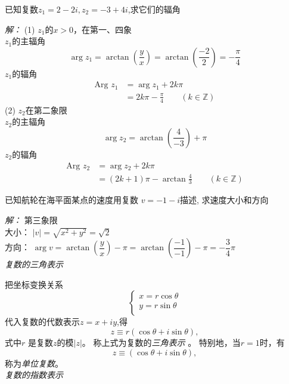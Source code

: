 \begin{example}
    已知复数$z_1=2-2i, z_2=-3+4i$,求它们的辐角
\end{example}
\emph{解： } (1) $z_1$的$x>0$，在第一、四象 \\
$z_1$的主辐角
\[ \arg z_1 = \arctan (\frac{y}{x} )  = \arctan (\frac{-2}{2} ) = - \frac{\pi}{4}\]
$z_1$的辐角
\[ \begin{aligned}
    \text{Arg } z_1   &= \arg z_1 + 2 k \pi \\ 
    &=  2 k \pi  - \frac{\pi}{4}  \qquad (k \in \mathbb{Z})
\end{aligned} \]
(2) $z_2$在第二象限 \\
$z_2$的主辐角
\[ \arg z_2 = \arctan (\frac{4}{-3}) + \pi \]
$z_2$的辐角
\[ \begin{aligned}
    \text{Arg } z_2  &=  \arg z_2 + 2 k \pi \\ 
    &=  (2 k +1 ) \pi  - \arctan \frac{4}{3} \qquad (k \in \mathbb{Z})
\end{aligned} \]
\begin{example}
    已知航轮在海平面某点的速度用复数 $v = - 1 - i$描述, 求速度大小和方向
\end{example}
\emph{解： }  第三象限   \\
大小： $\left\vert v \right\vert = \sqrt{x^2 + y^2} = \sqrt{2}  $ \\
方向： $\arg v = \arctan (\dfrac{y}{x}) - \pi = \arctan (\dfrac{-1}{-1}) - \pi  = - \dfrac{3}{4} \pi$ \\

\noindent \emph{复数的三角表示} 

把坐标变换关系
\[ \begin{cases}
	x = r\cos\theta \\
	y = r \sin \theta \\ 
\end{cases}\]
代入复数的代数表示$z= x+ iy$,得
\begin{equation}\label{eq:sjbs}
    z \equiv  r (\cos \theta + i \sin\theta ), 
\end{equation}
式中$r$ 是复数$z$的模$\left\vert z\right\vert $。 称上式为复数的\emph{三角表示 }。
特别地，当$r=1$时，有 
\begin{equation}\label{}
    z \equiv  (\cos \theta + i \sin\theta ), 
\end{equation}
称为\emph{单位复数}。\\

\noindent \emph{复数的指数表示} 

